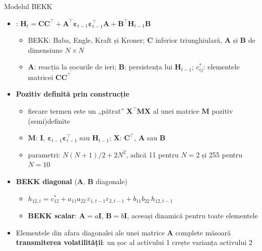 \begin{frame}{Modelul BEKK}
\itemsize{\footnotesize}
\begin{itemize}
    \item {}: $\mathbf{H}_t = \mathbf{C}\mathbf{C}^\top + \mathbf{A}^\top\boldsymbol{\varepsilon}_{t-1}\boldsymbol{\varepsilon}_{t-1}^\top\mathbf{A} + \mathbf{B}^\top\mathbf{H}_{t-1}\mathbf{B}$
    \begin{itemize}
        \item BEKK: Baba, Engle, Kraft și Kroner; $\mathbf{C}$ inferior triunghiulară, $\mathbf{A}$ și $\mathbf{B}$ de dimensiune $N \times N$
        \item $\mathbf{A}$: reacția la șocurile de ieri; $\mathbf{B}$: persistența lui $\mathbf{H}_{t-1}$; $c_{ij}^*$: elementele matricei $\mathbf{C}\mathbf{C}^\top$
    \end{itemize}
    \item \textbf{Pozitiv definită prin construcție}
    \begin{itemize}
        \item fiecare termen este un „pătrat” $\mathbf{X}^\top\mathbf{M}\mathbf{X}$ al unei matrice $\mathbf{M}$ pozitiv (semi)definite
        \item $\mathbf{M}$: $\mathbf{I}$, $\boldsymbol{\varepsilon}_{t-1}\boldsymbol{\varepsilon}_{t-1}^\top$ sau $\mathbf{H}_{t-1}$; $\mathbf{X}$: $\mathbf{C}^\top$, $\mathbf{A}$ sau $\mathbf{B}$
        \item parametri: $N(N+1)/2 + 2N^2$, adică 11 pentru $N = 2$ și 255 pentru $N = 10$
    \end{itemize}
    \item \textbf{BEKK diagonal} ($\mathbf{A}$, $\mathbf{B}$ diagonale)
    \begin{itemize}
        \item $h_{12,t} = c_{12}^* + a_{11}a_{22}\,\varepsilon_{1,t-1}\varepsilon_{2,t-1} + b_{11}b_{22}\,h_{12,t-1}$
        \item \textbf{BEKK scalar}: $\mathbf{A} = a\mathbf{I}$, $\mathbf{B} = b\mathbf{I}$, aceeași dinamică pentru toate elementele
    \end{itemize}
    \item Elementele din afara diagonalei ale unei matrice $\mathbf{A}$ complete măsoară \textbf{transmiterea volatilității}: un șoc al activului 1 crește varianța activului 2
\end{itemize}
\end{frame}

